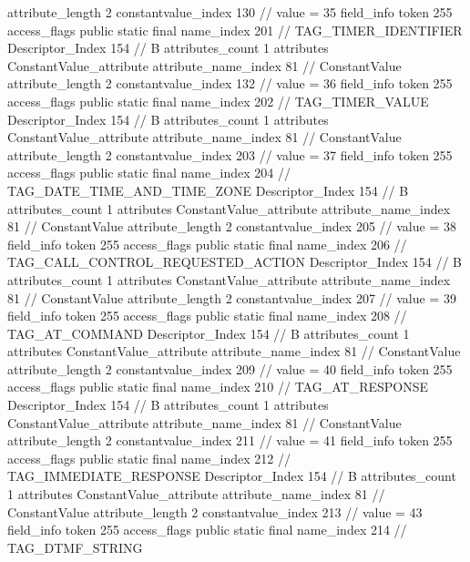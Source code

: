 {{{{{{{					attribute_length	2
					constantvalue_index	130		// value = 35
				}
				}
			}
			field_info {
				token	255
				access_flags	public static final
				name_index	201		// TAG_TIMER_IDENTIFIER
				Descriptor_Index	154		// B
				attributes_count	1
				attributes {
				ConstantValue_attribute {
					attribute_name_index	81		// ConstantValue
					attribute_length	2
					constantvalue_index	132		// value = 36
				}
				}
			}
			field_info {
				token	255
				access_flags	public static final
				name_index	202		// TAG_TIMER_VALUE
				Descriptor_Index	154		// B
				attributes_count	1
				attributes {
				ConstantValue_attribute {
					attribute_name_index	81		// ConstantValue
					attribute_length	2
					constantvalue_index	203		// value = 37
				}
				}
			}
			field_info {
				token	255
				access_flags	public static final
				name_index	204		// TAG_DATE_TIME_AND_TIME_ZONE
				Descriptor_Index	154		// B
				attributes_count	1
				attributes {
				ConstantValue_attribute {
					attribute_name_index	81		// ConstantValue
					attribute_length	2
					constantvalue_index	205		// value = 38
				}
				}
			}
			field_info {
				token	255
				access_flags	public static final
				name_index	206		// TAG_CALL_CONTROL_REQUESTED_ACTION
				Descriptor_Index	154		// B
				attributes_count	1
				attributes {
				ConstantValue_attribute {
					attribute_name_index	81		// ConstantValue
					attribute_length	2
					constantvalue_index	207		// value = 39
				}
				}
			}
			field_info {
				token	255
				access_flags	public static final
				name_index	208		// TAG_AT_COMMAND
				Descriptor_Index	154		// B
				attributes_count	1
				attributes {
				ConstantValue_attribute {
					attribute_name_index	81		// ConstantValue
					attribute_length	2
					constantvalue_index	209		// value = 40
				}
				}
			}
			field_info {
				token	255
				access_flags	public static final
				name_index	210		// TAG_AT_RESPONSE
				Descriptor_Index	154		// B
				attributes_count	1
				attributes {
				ConstantValue_attribute {
					attribute_name_index	81		// ConstantValue
					attribute_length	2
					constantvalue_index	211		// value = 41
				}
				}
			}
			field_info {
				token	255
				access_flags	public static final
				name_index	212		// TAG_IMMEDIATE_RESPONSE
				Descriptor_Index	154		// B
				attributes_count	1
				attributes {
				ConstantValue_attribute {
					attribute_name_index	81		// ConstantValue
					attribute_length	2
					constantvalue_index	213		// value = 43
				}
				}
			}
			field_info {
				token	255
				access_flags	public static final
				name_index	214		// TAG_DTMF_STRING
}}}}}
